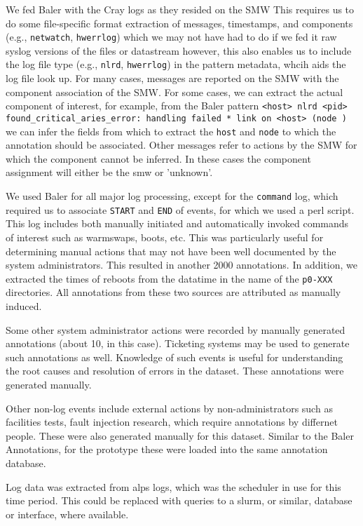 We fed Baler with the Cray logs as they resided on the SMW This requires us
to do some file-specific format extraction of messages, timestamps,
and components (e.g., \texttt{netwatch}, \texttt{hwerrlog}) which we may not have had to do if
we fed it raw syslog versions of the files or datastream however, this also enables us
to include the log file type (e.g., \texttt{nlrd}, \texttt{hwerrlog}) in the pattern metadata,
whcih aids the log file look up. For many cases, messages are reported
on the SMW with the component association of the SMW. For some cases, we can
extract the actual component of interest, for example, from the Baler pattern
\texttt{<host> nlrd <pid> found\_critical\_aries\_error: handling failed * link on <host> (node )}
we can infer the fields from which to extract the \texttt{host} and \texttt{node} to which
the annotation should be associated. Other messages refer to actions by the SMW for which
the component cannot be inferred. In these cases the component assignment will either be
the smw or 'unknown'.

We used Baler for all major log processing, except for the \texttt{command} log, which required us
to associate \texttt{START} and \texttt{END} of events, for which we used a perl script. This
log includes both manually initiated and automatically invoked commands of
interest such as warmswaps, boots, etc. This was particularly useful for
determining manual actions that may not have been well documented by the
system administrators. This resulted in another 2000 annotations. In addition,
we extracted the times of reboots from the datatime in the name of the \texttt{p0-XXX}
directories. All annotations from these two sources are attributed as manually induced.

Some other system administrator actions were recorded by manually generated annotations
(about 10, in this case). Ticketing systems may be used to generate such annotations as well.
Knowledge of such events is useful for understanding the root causes and resolution of errors
in the dataset. These annotations were generated manually.

Other non-log events include external actions by non-administrators
such as facilities tests, fault injection research, which require
annotations by differnet people. These were also generated manually
for this dataset. Similar to the Baler Annotations, for the
prototype these were loaded into the same annotation database.

Log data was extracted from alps logs, which was the scheduler in use for
this time period. This could be replaced with queries to a slurm,
or similar, database or interface, where available.

